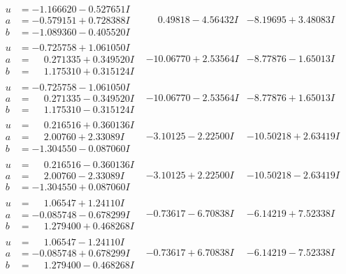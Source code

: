 \documentclass[1p]{elsarticle_modified}
\theoremstyle{definition}
\begin{document}
$$\begin{array}{c|c|c}
\begin{aligned}
u &= -1.166620 - 0.527651 I \\
a &= -0.579151 + 0.728388 I \\
b &= -1.089360 - 0.405520 I\end{aligned}
 & \phantom{-}0.49818 - 4.56432 I & -8.19695 + 3.48083 I \\ \hline\begin{aligned}
u &= -0.725758 + 1.061050 I \\
a &= \phantom{-}0.271335 + 0.349520 I \\
b &= \phantom{-}1.175310 + 0.315124 I\end{aligned}
 & -10.06770 + 2.53564 I & -8.77876 - 1.65013 I \\ \hline\begin{aligned}
u &= -0.725758 - 1.061050 I \\
a &= \phantom{-}0.271335 - 0.349520 I \\
b &= \phantom{-}1.175310 - 0.315124 I\end{aligned}
 & -10.06770 - 2.53564 I & -8.77876 + 1.65013 I \\ \hline\begin{aligned}
u &= \phantom{-}0.216516 + 0.360136 I \\
a &= \phantom{-}2.00760 + 2.33089 I \\
b &= -1.304550 - 0.087060 I\end{aligned}
 & -3.10125 - 2.22500 I & -10.50218 + 2.63419 I \\ \hline\begin{aligned}
u &= \phantom{-}0.216516 - 0.360136 I \\
a &= \phantom{-}2.00760 - 2.33089 I \\
b &= -1.304550 + 0.087060 I\end{aligned}
 & -3.10125 + 2.22500 I & -10.50218 - 2.63419 I \\ \hline\begin{aligned}
u &= \phantom{-}1.06547 + 1.24110 I \\
a &= -0.085748 - 0.678299 I \\
b &= \phantom{-}1.279400 + 0.468268 I\end{aligned}
 & -0.73617 - 6.70838 I & -6.14219 + 7.52338 I \\ \hline\begin{aligned}
u &= \phantom{-}1.06547 - 1.24110 I \\
a &= -0.085748 + 0.678299 I \\
b &= \phantom{-}1.279400 - 0.468268 I\end{aligned}
 & -0.73617 + 6.70838 I & -6.14219 - 7.52338 I \\ \hline\begin{aligned}

\end{aligned}
\end{array}$$
\end{document}
